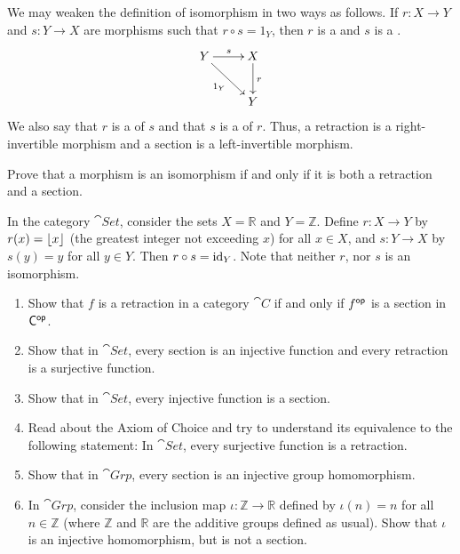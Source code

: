 We may weaken the definition of isomorphism in two ways as follows. If $r \colon X \to Y$ and $s \colon Y \to X$ are morphisms such that $r \circ s = 1_Y$, then $r$ is a  and $s$ is a .
\begin{equation*}
\xymatrix{
Y \ar[r]^s \ar[rd]_{1_Y} & X \ar[d]^r \\
& Y
}
\end{equation*}
We also say that $r$ is a  of $s$ and that $s$ is a  of $r$. Thus, a retraction is a right-invertible morphism and a section is a left-invertible morphism.

\begin{Exercise}
Prove that a morphism is an isomorphism if and only if it is both a retraction and a section.


\end{Exercise}

\begin{Example}\label{ex:SetRetSec}
In the category $\cat{Set}$, consider the sets $X = \mathbb R$ and $Y = \mathbb Z$. Define $r \colon X \to Y$ by $r(x) = \lfloor x\rfloor$ (the greatest integer not exceeding $x$) for all $x \in X$, and $s \colon Y \to X$ by $s(y) = y$ for all $y \in Y$. Then $r \circ s = \mathrm{id}_Y$. Note that neither $r$, nor $s$ is an isomorphism.
\end{Example}

\begin{Exercise}
\begin{enumerate}
\item Show that $f$ is a retraction in a category $\cat C$ if and only if $f^\mathsf{op}$ is a section in $\mathsf{C}^\mathsf{op}$.
\item Show that in $\cat{Set}$, every section is an injective function and every retraction is a surjective function.
\item Show that in $\cat{Set}$, every injective function is a section.
\item Read about the Axiom of Choice and try to understand its equivalence to the following statement: In $\cat{Set}$, every surjective function is a retraction.
\item Show that in $\cat{Grp}$, every section is an injective group homomorphism.
\item In $\cat{Grp}$, consider the inclusion map $\iota \colon \mathbb Z \to \mathbb R$ defined by $\iota(n) = n$ for all $n \in \mathbb Z$ (where $\mathbb Z$ and $\mathbb R$ are the additive groups defined as usual). Show that $\iota$ is an injective homomorphism, but is not a section.
\end{enumerate}
\end{Exercise}

